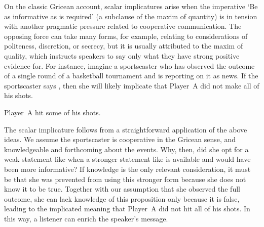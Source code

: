 \documentclass[leqno,12pt]{article}
\begin{document}
On the classic Gricean account, scalar implicatures arise when the
imperative `Be as informative as is required' (a subclause of the
maxim of quantity) is in tension with another pragmatic pressure
related to cooperative communication. The opposing force can take many
forms, for example, relating to considerations of politeness,
discretion, or secrecy, but it is usually attributed to the maxim of
quality, which instructs speakers to say only what they have strong
positive evidence for. For instance, imagine a sportscaster who has
observed the outcome of a single round of a basketball tournament and
is reporting on it as news. If the sportscaster says , then
she will likely implicate that Player~A did not make all of his shots.
%
\begin{examples}
\item\label{some} Player~A hit some of his shots.
\end{examples}

The scalar implicature follows from a straightforward application of
the above ideas. We assume the sportscaster is cooperative in the
Gricean sense, and knowledgeable and forthcoming about the
events. Why, then, did she opt for a weak statement like
 when a stronger statement like
 is available and would have been
more informative?  If knowledge is the only relevant consideration, it
must be that she was prevented from using this stronger form because
she does not know it to be true. Together with our assumption that she
observed the full outcome, she can lack knowledge of this proposition
only because it is false, leading to the implicated meaning that
Player~A did not hit all of his shots. In this way, a listener can
enrich the speaker's message.
\end{document}

